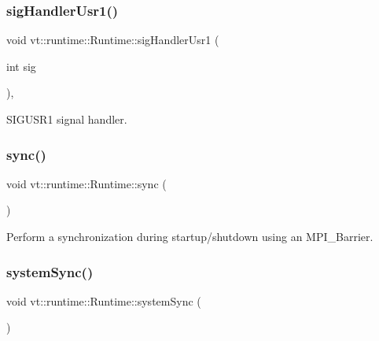 \subsubsection{\texorpdfstring{sig\+Handler\+Usr1()}{sigHandlerUsr1()}}
{\footnotesize\ttfamily void vt\+::runtime\+::\+Runtime\+::sig\+Handler\+Usr1 (\begin{DoxyParamCaption}\item[{int}]{sig }\end{DoxyParamCaption})\hspace{0.3cm}{\ttfamily [static]}, {\ttfamily [protected]}}



S\+I\+G\+U\+S\+R1 signal handler. 

\mbox{\label{structvt_1_1runtime_1_1_runtime_a92fe07cb78904559dfc21de68018fb53}} 
\subsubsection{\texorpdfstring{sync()}{sync()}}
{\footnotesize\ttfamily void vt\+::runtime\+::\+Runtime\+::sync (\begin{DoxyParamCaption}{ }\end{DoxyParamCaption})\hspace{0.3cm}{\ttfamily [protected]}}



Perform a synchronization during startup/shutdown using an {\ttfamily M\+P\+I\+\_\+\+Barrier}. 

\mbox{\label{structvt_1_1runtime_1_1_runtime_a34252fc839ea767c8fca1efb97918385}} 
\subsubsection{\texorpdfstring{system\+Sync()}{systemSync()}}
{\footnotesize\ttfamily void vt\+::runtime\+::\+Runtime\+::system\+Sync (\begin{DoxyParamCaption}{ }\end{DoxyParamCaption})\hspace{0.3cm}{\ttfamily [inline]}}



